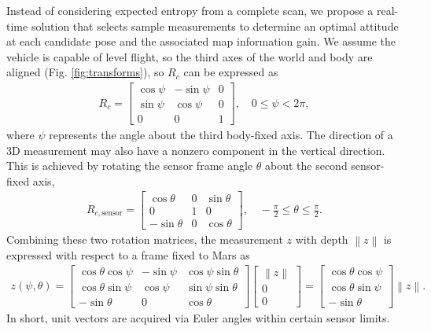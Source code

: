 \documentclass[conf]{new-aiaa}
\newcommand{\norm}[1]{\ensuremath{\left\| #1 \right\|}}
\begin{document}
Instead of considering expected entropy from a complete scan, we propose a real-time solution that selects sample measurements to determine an optimal attitude at each candidate pose and the associated map information gain. We assume the vehicle is capable of level flight, so the third axes of the world and body are aligned (Fig. \ref{fig:transforms}), so $R_c$ can be expressed as
\begin{align*}
R_c=\begin{bmatrix}
\cos\psi & -\sin\psi & 0
\\
\sin\psi & \cos\psi & 0
\\
0 & 0 & 1
\end{bmatrix}, \quad 0\leq\psi<2\pi,
\end{align*}
where $\psi$ represents the angle about the third body-fixed axis. The direction of a 3D measurement may also have a nonzero component in the vertical direction. This is achieved by rotating the sensor frame angle $\theta$ about the second sensor-fixed axis,
\begin{align*}
R_{c,\text{sensor}}=\begin{bmatrix}
\cos\theta & 0 & \sin\theta
\\
0 & 1 & 0
\\
-\sin\theta & 0 & \cos\theta
\end{bmatrix}, \quad -\frac{\pi}{2}\leq\theta\leq\frac{\pi}{2}.
\end{align*}
Combining these two rotation matrices, the measurement $z$ with depth $\norm{z}$ is expressed with respect to a frame fixed to Mars as
\begin{align}
z(\psi,\theta)=\begin{bmatrix}\cos\theta\cos\psi & -\sin\psi & \cos\psi\sin\theta
\\
\cos\theta\sin\psi & \cos\psi & \sin\psi\sin\theta
\\
-\sin\theta & 0 & \cos\theta
\end{bmatrix}
\begin{bmatrix}
\norm{z} \\ 0 \\ 0
\end{bmatrix}
=
\begin{bmatrix}
\cos\theta\cos\psi
\\
\cos\theta\sin\psi
\\
-\sin\theta
\end{bmatrix}\norm{z}.
\end{align}
In short, unit vectors are acquired via Euler angles within certain sensor limits.
\end{document}
